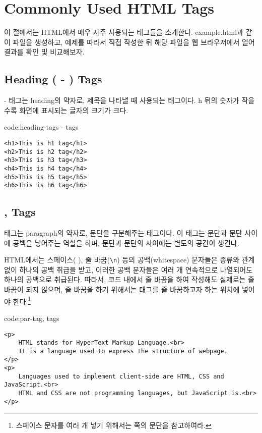 \section{Commonly Used HTML Tags}\label{sect:common-html-tags}

이 절에서는 HTML에서 매우 자주 사용되는 태그들을 소개한다. example.html과 같이 파일을 생성하고, 예제를 따라서 직접 작성한 뒤 해당 파일을 웹 브라우저에서 열어 결과를 확인 및 비교해보자.

\subsection*{Heading ( - ) Tags}
 -  태그는 heading의 약자로, 제목을 나타낼 때 사용되는 태그이다. h 뒤의 숫자가 작을수록 화면에 표시되는 글자의 크기가 크다.

\begin{code}{code:heading-tags}{ -  tags}
\begin{verbatim}
<h1>This is h1 tag</h1>
<h2>This is h2 tag</h2>
<h3>This is h3 tag</h3>
<h4>This is h4 tag</h4>
<h5>This is h5 tag</h5>
<h6>This is h6 tag</h6>
\end{verbatim}
\end{code}

\subsection*{,  Tags}
 태그는 paragraph의 약자로, 문단을 구분해주는 태그이다. 이 태그는 문단과 문단 사이에 공백을 넣어주는 역할을 하며, 문단과 문단의 사이에는 별도의 공간이 생긴다.

HTML에서는 스페이스( ), 줄 바꿈(\verb|\n|) 등의 공백(whitespace) 문자들은 종류와 관계없이 하나의 공백 취급을 받고, 이러한 공백 문자들은 여러 개 연속적으로 나열되어도 하나의 공백으로 취급된다. 따라서, 코드 내에서 줄 바꿈을 하여 작성해도 실제로는 줄 바꿈이 되지 않으며, 줄 바꿈을 하기 위해서는  태그를 줄 바꿈하고자 하는 위치에 넣어야 한다.\footnote{스페이스 문자를 여러 개 넣기 위해서는 \pageref{etc:nbsp}쪽의  문단을 참고하여라.}

\begin{code}{code:par-tag}{,  tags}
\begin{verbatim}
<p>
    HTML stands for HyperText Markup Language.<br>
    It is a language used to express the structure of webpage.
</p>
<p>
    Languages used to implement client-side are HTML, CSS and JavaScript.<br>
    HTML and CSS are not programming languages, but JavaScript is.<br>
</p>
\end{verbatim}
\end{code}

